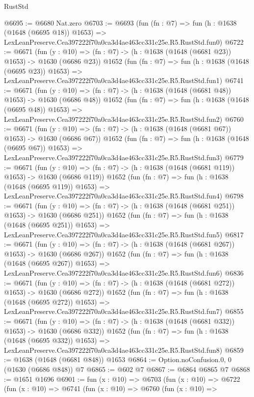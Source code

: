 \begin{lexlean}{RustStd}
\begin{coremodule}
@6695 := @6680 Nat.zero
@6703 := @6693
    (fun (fn : @7) =>
    fun (h : @1638 (@1648 (@6695 @18)) @1653) =>
    LexLeanPreserve.Cea397222f70a0ca3d4ae463cc331c25e.R5.RustStd.fun0)
@6722 := @6671
    (fun (y : @10) => (fn : @7) -> (h : @1638 (@1648 (@6681 @23)) @1653) -> @1630 (@6686 @23))
    @1652
    (fun (fn : @7) =>
    fun (h : @1638 (@1648 (@6695 @23)) @1653) =>
    LexLeanPreserve.Cea397222f70a0ca3d4ae463cc331c25e.R5.RustStd.fun1)
@6741 := @6671
    (fun (y : @10) => (fn : @7) -> (h : @1638 (@1648 (@6681 @48)) @1653) -> @1630 (@6686 @48))
    @1652
    (fun (fn : @7) =>
    fun (h : @1638 (@1648 (@6695 @48)) @1653) =>
    LexLeanPreserve.Cea397222f70a0ca3d4ae463cc331c25e.R5.RustStd.fun2)
@6760 := @6671
    (fun (y : @10) => (fn : @7) -> (h : @1638 (@1648 (@6681 @67)) @1653) -> @1630 (@6686 @67))
    @1652
    (fun (fn : @7) =>
    fun (h : @1638 (@1648 (@6695 @67)) @1653) =>
    LexLeanPreserve.Cea397222f70a0ca3d4ae463cc331c25e.R5.RustStd.fun3)
@6779 := @6671
    (fun (y : @10) => (fn : @7) -> (h : @1638 (@1648 (@6681 @119)) @1653) -> @1630 (@6686 @119))
    @1652
    (fun (fn : @7) =>
    fun (h : @1638 (@1648 (@6695 @119)) @1653) =>
    LexLeanPreserve.Cea397222f70a0ca3d4ae463cc331c25e.R5.RustStd.fun4)
@6798 := @6671
    (fun (y : @10) => (fn : @7) -> (h : @1638 (@1648 (@6681 @251)) @1653) -> @1630 (@6686 @251))
    @1652
    (fun (fn : @7) =>
    fun (h : @1638 (@1648 (@6695 @251)) @1653) =>
    LexLeanPreserve.Cea397222f70a0ca3d4ae463cc331c25e.R5.RustStd.fun5)
@6817 := @6671
    (fun (y : @10) => (fn : @7) -> (h : @1638 (@1648 (@6681 @267)) @1653) -> @1630 (@6686 @267))
    @1652
    (fun (fn : @7) =>
    fun (h : @1638 (@1648 (@6695 @267)) @1653) =>
    LexLeanPreserve.Cea397222f70a0ca3d4ae463cc331c25e.R5.RustStd.fun6)
@6836 := @6671
    (fun (y : @10) => (fn : @7) -> (h : @1638 (@1648 (@6681 @272)) @1653) -> @1630 (@6686 @272))
    @1652
    (fun (fn : @7) =>
    fun (h : @1638 (@1648 (@6695 @272)) @1653) =>
    LexLeanPreserve.Cea397222f70a0ca3d4ae463cc331c25e.R5.RustStd.fun7)
@6855 := @6671
    (fun (y : @10) => (fn : @7) -> (h : @1638 (@1648 (@6681 @332)) @1653) -> @1630 (@6686 @332))
    @1652
    (fun (fn : @7) =>
    fun (h : @1638 (@1648 (@6695 @332)) @1653) =>
    LexLeanPreserve.Cea397222f70a0ca3d4ae463cc331c25e.R5.RustStd.fun8)
@6859 := @1638 (@1648 (@6681 @848)) @1653
@6864 := Option.noConfusion.{0, 0} (@1630 (@6686 @848)) @7
@6865 := @602 @7
@6867 := @6864 @6865 @7
@6868 := @1651 @1696
@6901 := fun (x : @10) =>
  @6703
    (fun (x : @10) =>
    @6722
      (fun (x : @10) =>
      @6741
        (fun (x : @10) =>
        @6760
          (fun (x : @10) =>

\end{coremodule}
\end{lexlean}
